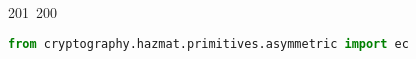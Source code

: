 201~200~\documentclass{article}
\begin{document}
	                                                                                                                                                                                                                                                                                                	                                                                                                                                        	    	                                                                                                	                                                                                                                                                                                                                                                                                                                                	                                                                        	                                                                        	                                                                                                                                        	                                                                                                                                                                                                                        	                                                                                                \begin{lstlisting}[language=Python, caption=Signing and Verifying Messages]
	                                                                                                                                                                                                                                                                                                	                                                                                                                                        	    	                                                                                                	                                                                                                                                                                                                                                                                                                                                	                                                                        	                                                                        	                                                                                                                                        	                                                                                                                                                                                                                        	                                                                                                from cryptography.hazmat.primitives.asymmetric import ec

\end{lstlisting}
\end{document}
